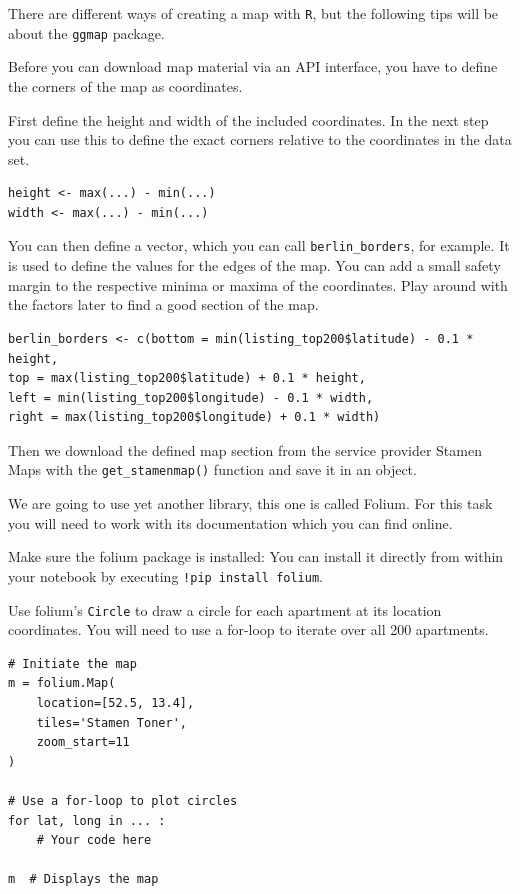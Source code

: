 \documentclass[
  11pt,
]{book}
\newenvironment{tips}[1]
  {
  \begin{itemize}
  \footnotesize
  \renewcommand{\labelitemi}{
    \raisebox{-.7\height}[0pt][0pt]{
      {\setkeys{Gin}{width=3em,keepaspectratio}
        \texttt{[image: images/\#1.png]}}
    }
  }
  \setlength{\fboxsep}{1em}
  \begin{rbox}
  \item
  }
  {
  \end{rbox}
  \end{itemize}
  }
\newenvironment{tipsp}[1]
  {
  \begin{itemize}
  \footnotesize
  \renewcommand{\labelitemi}{
    \raisebox{-.7\height}[0pt][0pt]{
      {\setkeys{Gin}{width=3em,keepaspectratio}
        \texttt{[image: images/\#1.png]}}
    }
  }
  \setlength{\fboxsep}{1em}
  \begin{pbox}
  \item
  }
  {
  \end{pbox}
  \end{itemize}
  }
\begin{document}
\begin{tips}r

There are different ways of creating a map with \texttt{R}, but the following tips will be about the \texttt{ggmap} package.

Before you can download map material via an API interface, you have to define the corners of the map as coordinates.

First define the height and width of the included coordinates. In the next step you can use this to define the exact corners relative to the coordinates in the data set.

\begin{verbatim}
height <- max(...) - min(...)
width <- max(...) - min(...)
\end{verbatim}

You can then define a vector, which you can call \texttt{berlin\_borders}, for example. It is used to define the values for the edges of the map. You can add a small safety margin to the respective minima or maxima of the coordinates. Play around with the factors later to find a good section of the map.

\begin{verbatim}
berlin_borders <- c(bottom = min(listing_top200$latitude) - 0.1 * height,
top = max(listing_top200$latitude) + 0.1 * height,
left = min(listing_top200$longitude) - 0.1 * width,
right = max(listing_top200$longitude) + 0.1 * width)
\end{verbatim}

Then we download the defined map section from the service provider Stamen Maps with the \texttt{get\_stamenmap()} function and save it in an object.

\end{tips}

\begin{tipsp}p

We are going to use yet another library, this one is called Folium. For this task you will need to work with its documentation which you can find online.

Make sure the folium package is installed: You can install it directly from within your notebook by executing \texttt{!pip\ install\ folium}.

Use folium's \texttt{Circle} to draw a circle for each apartment at its location coordinates. You will need to use a for-loop to iterate over all 200 apartments.

\begin{verbatim}
# Initiate the map
m = folium.Map(
    location=[52.5, 13.4],
    tiles='Stamen Toner',
    zoom_start=11
)

# Use a for-loop to plot circles
for lat, long in ... :
    # Your code here

m  # Displays the map
\end{verbatim}

\end{tipsp}
\end{document}
